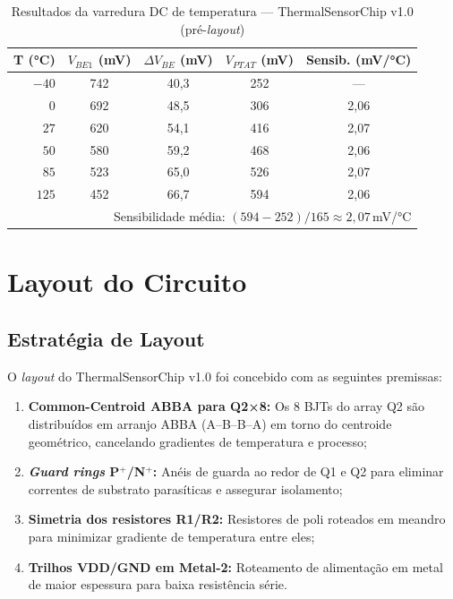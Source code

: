 \documentclass[12pt,a4paper]{article}
\begin{document}
\begin{table}[h!]
\centering
\caption{Resultados da varredura DC de temperatura --- ThermalSensorChip v1.0 (pré-\textit{layout})}
\label{tab:dc}
\begin{tabular}{rcccc}
\toprule
\textbf{T (°C)} & \textbf{$V_{BE1}$ (mV)} & \textbf{$\Delta V_{BE}$ (mV)} &
\textbf{$V_{PTAT}$ (mV)} & \textbf{Sensib. (mV/°C)} \\
\midrule
$-40$ & 742 & 40,3 & 252 & --- \\
$  0$ & 692 & 48,5 & 306 & 2,06 \\
$ 27$ & 620 & 54,1 & 416 & 2,07 \\
$ 50$ & 580 & 59,2 & 468 & 2,06 \\
$ 85$ & 523 & 65,0 & 526 & 2,07 \\
$125$ & 452 & 66,7 & 594 & 2,06 \\
\bottomrule
\multicolumn{5}{r}{\small Sensibilidade média: $(594-252)/165 \approx 2{,}07$\,mV/°C}
\end{tabular}
\end{table}

\section{Layout do Circuito}

\subsection{Estratégia de Layout}

O \textit{layout} do ThermalSensorChip v1.0 foi concebido com as seguintes premissas:
\begin{enumerate}[leftmargin=2em,label=\textbf{(\arabic*)}]
  \item \textbf{Common-Centroid ABBA para Q2×8:} Os 8 BJTs do array Q2 são distribuídos
        em arranjo ABBA (A--B--B--A) em torno do centroide geométrico, cancelando gradientes
        de temperatura e processo;
  \item \textbf{\textit{Guard rings} P$^+$/N$^+$:} Anéis de guarda ao redor de Q1 e Q2
        para eliminar correntes de substrato parasíticas e assegurar isolamento;
  \item \textbf{Simetria dos resistores R1/R2:} Resistores de poli roteados em meandro
        para minimizar gradiente de temperatura entre eles;
  \item \textbf{Trilhos VDD/GND em Metal-2:} Roteamento de alimentação em metal de maior
        espessura para baixa resistência série.
\end{enumerate}
\end{document}
